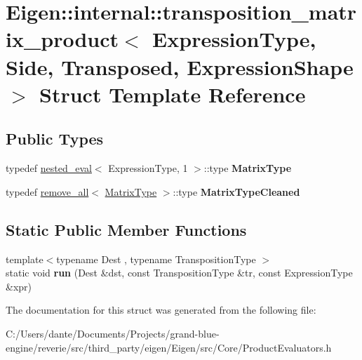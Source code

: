 \hypertarget{struct_eigen_1_1internal_1_1transposition__matrix__product}{}\section{Eigen\+::internal\+::transposition\+\_\+matrix\+\_\+product$<$ Expression\+Type, Side, Transposed, Expression\+Shape $>$ Struct Template Reference}
\label{struct_eigen_1_1internal_1_1transposition__matrix__product}
\subsection*{Public Types}
\begin{DoxyCompactItemize}
\item 
\mbox{\label{struct_eigen_1_1internal_1_1transposition__matrix__product_a65ac4555eea7a17d6f99ee540ad421ea}} 
typedef \mbox{\hyperlink{struct_eigen_1_1internal_1_1nested__eval}{nested\+\_\+eval}}$<$ Expression\+Type, 1 $>$\+::type {\bfseries Matrix\+Type}
\item 
\mbox{\label{struct_eigen_1_1internal_1_1transposition__matrix__product_afbd4b03e800ef2374758ea5770b868b9}} 
typedef \mbox{\hyperlink{struct_eigen_1_1internal_1_1remove__all}{remove\+\_\+all}}$<$ \mbox{\hyperlink{struct_eigen_1_1internal_1_1true__type}{Matrix\+Type}} $>$\+::type {\bfseries Matrix\+Type\+Cleaned}
\end{DoxyCompactItemize}
\subsection*{Static Public Member Functions}
\begin{DoxyCompactItemize}
\item 
\mbox{\label{struct_eigen_1_1internal_1_1transposition__matrix__product_a35b39d1ac053d48b58de279b9256823c}} 
{\footnotesize template$<$typename Dest , typename Transposition\+Type $>$ }\\static void {\bfseries run} (Dest \&dst, const Transposition\+Type \&tr, const Expression\+Type \&xpr)
\end{DoxyCompactItemize}


The documentation for this struct was generated from the following file\+:\begin{DoxyCompactItemize}
\item 
C\+:/\+Users/dante/\+Documents/\+Projects/grand-\/blue-\/engine/reverie/src/third\+\_\+party/eigen/\+Eigen/src/\+Core/Product\+Evaluators.\+h\end{DoxyCompactItemize}
